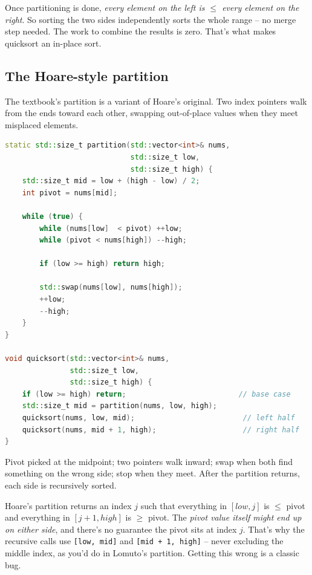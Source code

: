 \documentclass[11pt]{article}
\begin{document}
\begin{ideabox}
Once partitioning is done, \emph{every element on the left is $\le$
every element on the right}. So sorting the two sides independently
sorts the whole range -- no merge step needed. The work to combine
the results is zero. That's what makes quicksort an in-place sort.
\end{ideabox}

\subsection{The Hoare-style partition}

The textbook's partition is a variant of Hoare's original. Two index
pointers walk from the ends toward each other, swapping out-of-place
values when they meet misplaced elements.

\begin{examplebox}
\begin{lstlisting}[basicstyle=\ttfamily\small,frame=single,language=C++]
static std::size_t partition(std::vector<int>& nums,
                             std::size_t low,
                             std::size_t high) {
    std::size_t mid = low + (high - low) / 2;
    int pivot = nums[mid];

    while (true) {
        while (nums[low]  < pivot) ++low;
        while (pivot < nums[high]) --high;

        if (low >= high) return high;

        std::swap(nums[low], nums[high]);
        ++low;
        --high;
    }
}

void quicksort(std::vector<int>& nums,
               std::size_t low,
               std::size_t high) {
    if (low >= high) return;                          // base case
    std::size_t mid = partition(nums, low, high);
    quicksort(nums, low, mid);                         // left half
    quicksort(nums, mid + 1, high);                    // right half
}
\end{lstlisting}
Pivot picked at the midpoint; two pointers walk inward; swap when
both find something on the wrong side; stop when they meet. After
the partition returns, each side is recursively sorted.
\end{examplebox}

\begin{warnbox}
Hoare's partition returns an index $j$ such that everything in
$[low, j]$ is $\le$ pivot and everything in $[j+1, high]$ is
$\ge$ pivot. The \emph{pivot value itself might end up on either
side}, and there's no guarantee the pivot sits at index $j$. That's
why the recursive calls use \texttt{[low, mid]} and
\texttt{[mid + 1, high]} -- never excluding the middle index, as
you'd do in Lomuto's partition. Getting this wrong is a classic
bug.
\end{warnbox}
\end{document}
